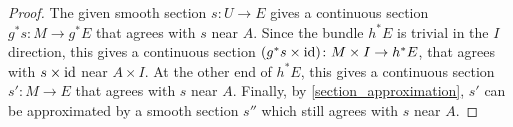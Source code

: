 \documentclass[11pt]{amsart}
\theoremstyle{definition}
\numberwithin{equation}{section}
\numberwithin{figure}{section}
\newcommand{\id}{\textup{id}}
\begin{document}
\begin{proof}
The given smooth section $s\colon U \to E$ gives a continuous section $g^*s\colon M \to g^*E$ that agrees with $s$ near $A$. Since the bundle $h^*E$ is trivial in the $I$ direction, this gives a continuous section $(g^*s \times \id)\colon M \times I \to h^*E$, that agrees with $s \times \id$ near $A \times I$. At the other end of $h^*E$, this gives a continuous section $s'\colon M \to E$ that agrees with $s$ near $A$. Finally, by \autoref{section_approximation}, $s'$ can be approximated by a smooth section $s''$ which still agrees with $s$ near $A$.
%
%
\end{proof}
\end{document}
